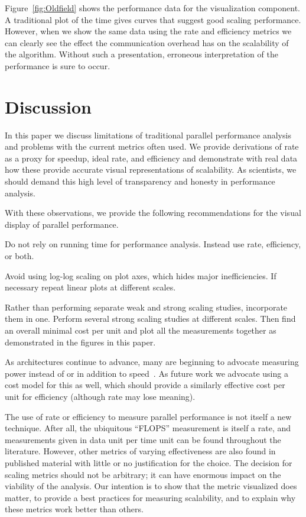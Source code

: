\documentclass[conference]{IEEEtran}
\newcommand*{\lcite}[1]{~\cite{#1}}
\newenvironment{packed_itemize}{
  \begin{itemize}[noitemsep]
}{
  \end{itemize}
}
\begin{document}
Figure~\ref{fig:Oldfield} shows the performance data for the visualization
component. A traditional plot of the time gives curves that suggest good
scaling performance. However, when we show the same data using the rate and
efficiency metrics we can clearly see the effect the communication overhead
has on the scalability of the algorithm. Without such a presentation,
erroneous interpretation of the performance is sure to occur.

\section{Discussion}

\noindent
In this paper we discuss limitations of traditional parallel performance
analysis and problems with the current metrics often used. We provide
derivations of rate as a proxy for speedup, ideal rate, and efficiency and
demonstrate with real data how these provide accurate visual
representations of scalability. As scientists, we should demand this high
level of transparency and honesty in performance analysis.

With these observations, we provide the following recommendations for the
visual display of parallel performance.
\begin{packed_itemize}
\item Do not rely on running time for performance analysis. Instead use
  rate, efficiency, or both.
\item Avoid using log-log scaling on plot axes, which hides major
  inefficiencies. If necessary repeat linear plots at different scales.
\item Rather than performing separate weak and strong scaling studies,
  incorporate them in one. Perform several strong scaling studies at
  different scales. Then find an overall minimal cost per unit and plot all
  the measurements together as demonstrated in the figures in this paper.
\end{packed_itemize}

As architectures continue to advance, many are beginning to advocate
measuring power instead of or in addition to speed\lcite{Cameron2012}. As
future work we advocate using a cost model for this as well, which should
provide a similarly effective cost per unit for efficiency (although rate
may lose meaning).

The use of rate or efficiency to measure parallel performance is not itself
a new technique. After all, the ubiquitous ``FLOPS'' measurement is itself
a rate, and measurements given in data unit per time unit can be found
throughout the literature. However, other metrics of varying effectiveness
are also found in published material with little or no justification for
the choice. The decision for scaling metrics should not be arbitrary; it
can have enormous impact on the viability of the analysis. Our intention is
to show that the metric visualized does matter, to provide a best practices
for measuring scalability, and to explain why these metrics work better
than others.
\end{document}
